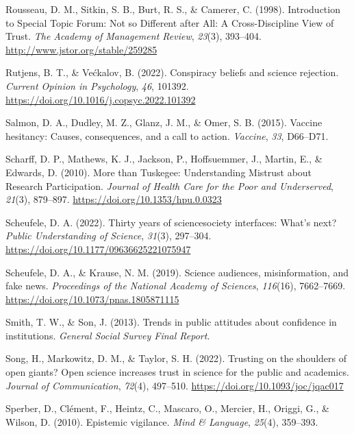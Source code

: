 \documentclass[
  jou,
  floatsintext,
  longtable,
  nolmodern,
  notxfonts,
  notimes,
  colorlinks=true,linkcolor=blue,citecolor=blue,urlcolor=blue]{apa7}
\newlength{\cslhangindent}
\newenvironment{CSLReferences}[2] %
 {\begin{list}{}{%
  \setlength{\itemindent}{0pt}
  \setlength{\leftmargin}{0pt}
  \setlength{\parsep}{0pt}
  \ifodd #1
   \setlength{\leftmargin}{\cslhangindent}
   \setlength{\itemindent}{-1\cslhangindent}
  \fi
  \setlength{\itemsep}{#2\baselineskip}}}
 {\end{list}}
\begin{document}
\begin{CSLReferences}{1}{0}
Rousseau, D. M., Sitkin, S. B., Burt, R. S., \& Camerer, C. (1998).
Introduction to Special Topic Forum: Not so Different after All: A
Cross-Discipline View of Trust. \emph{The Academy of Management Review},
\emph{23}(3), 393--404. \url{http://www.jstor.org/stable/259285}

Rutjens, B. T., \& Većkalov, B. (2022). Conspiracy beliefs and science
rejection. \emph{Current Opinion in Psychology}, \emph{46}, 101392.
\url{https://doi.org/10.1016/j.copsyc.2022.101392}

Salmon, D. A., Dudley, M. Z., Glanz, J. M., \& Omer, S. B. (2015).
Vaccine hesitancy: Causes, consequences, and a call to action.
\emph{Vaccine}, \emph{33}, D66--D71.

Scharff, D. P., Mathews, K. J., Jackson, P., Hoffsuemmer, J., Martin,
E., \& Edwards, D. (2010). More than Tuskegee: Understanding Mistrust
about Research Participation. \emph{Journal of Health Care for the Poor
and Underserved}, \emph{21}(3), 879--897.
\url{https://doi.org/10.1353/hpu.0.0323}

Scheufele, D. A. (2022). Thirty years of science{\textendash}society
interfaces: What{'}s next? \emph{Public Understanding of Science},
\emph{31}(3), 297--304. \url{https://doi.org/10.1177/09636625221075947}

Scheufele, D. A., \& Krause, N. M. (2019). Science audiences,
misinformation, and fake news. \emph{Proceedings of the National Academy
of Sciences}, \emph{116}(16), 7662--7669.
\url{https://doi.org/10.1073/pnas.1805871115}

Smith, T. W., \& Son, J. (2013). Trends in public attitudes about
confidence in institutions. \emph{General Social Survey Final Report}.

Song, H., Markowitz, D. M., \& Taylor, S. H. (2022). Trusting on the
shoulders of open giants? Open science increases trust in science for
the public and academics. \emph{Journal of Communication}, \emph{72}(4),
497--510. \url{https://doi.org/10.1093/joc/jqac017}

Sperber, D., Clément, F., Heintz, C., Mascaro, O., Mercier, H., Origgi,
G., \& Wilson, D. (2010). Epistemic vigilance. \emph{Mind \& Language},
\emph{25}(4), 359--393.


\end{CSLReferences}
\end{document}
